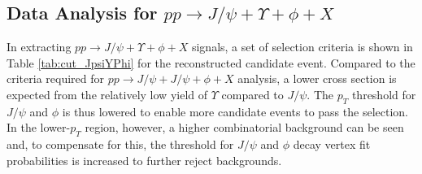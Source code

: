 \documentclass[10pt,twocolumn]{article}
\begin{document}
\subsection{Data Analysis for $pp\to J/\psi+\Upsilon+\phi+X$}

In extracting $pp\to J/\psi+\Upsilon+\phi+X$ signals, a set of selection criteria is shown in Table \ref{tab:cut_JpsiYPhi} for the reconstructed candidate event. Compared to the criteria required for $pp \to J/\psi+J/\psi+\phi+X$ analysis, a lower cross section is expected from the relatively low yield of $\Upsilon$ compared to $J/\psi$. The $p_T$ threshold for $J/\psi$ and $\phi$ is thus lowered to enable more candidate events to pass the selection. In the lower-$p_T$ region, however, a higher combinatorial background can be seen and, to compensate for this, the threshold for $J/\psi$ and $\phi$ decay vertex fit probabilities is increased to further reject backgrounds.
\end{document}
